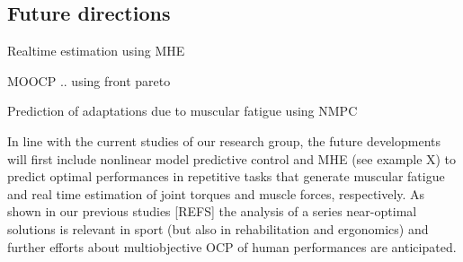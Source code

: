 \subsection{Future directions}
Realtime estimation using MHE

MOOCP .. using front pareto

Prediction of adaptations due to muscular fatigue using NMPC

In line with the current studies of our research group, the future developments will first include nonlinear model predictive control and MHE (see example X) to predict optimal performances in repetitive tasks that generate muscular fatigue and real time estimation of joint torques and muscle forces, respectively. As shown in our previous studies [REFS] the analysis of a series near-optimal solutions is relevant in sport (but also in rehabilitation and ergonomics) and further efforts about multiobjective OCP of human performances are anticipated. 
